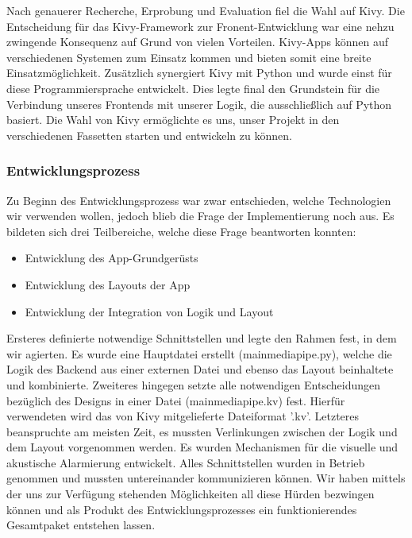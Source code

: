 		Nach genauerer Recherche, Erprobung und Evaluation fiel die Wahl auf Kivy. Die Entscheidung für das Kivy-Framework zur Fronent-Entwicklung war eine nehzu zwingende Konsequenz auf Grund von vielen Vorteilen. Kivy-Apps können auf verschiedenen Systemen zum Einsatz kommen und bieten somit eine breite Einsatzmöglichkeit. Zusätzlich synergiert Kivy mit Python und wurde einst für diese Programmiersprache entwickelt. Dies legte final den Grundstein für die Verbindung unseres Frontends mit unserer Logik, die ausschließlich auf Python basiert. Die Wahl von Kivy ermöglichte es uns, unser Projekt in den verschiedenen Fassetten starten und entwickeln zu können.
		
	\subsubsection{Entwicklungsprozess}
	\label{sssec:entwicklung}
		
		Zu Beginn des Entwicklungsprozess war zwar entschieden, welche Technologien wir verwenden wollen, jedoch blieb die Frage der Implementierung noch aus. Es bildeten sich drei Teilbereiche, welche diese Frage beantworten konnten:
		\begin{itemize}
			\item Entwicklung des App-Grundgerüsts
			\item Entwicklung des Layouts der App
			\item Entwicklung der Integration von Logik und Layout
		\end{itemize}
		
		\noindent Ersteres definierte notwendige Schnittstellen und legte den Rahmen fest, in dem wir agierten. Es wurde eine Hauptdatei erstellt (mainmediapipe.py), welche die Logik des Backend aus einer externen Datei und ebenso das Layout beinhaltete und kombinierte. Zweiteres hingegen setzte alle notwendigen Entscheidungen bezüglich des Designs in einer Datei (mainmediapipe.kv) fest. Hierfür verwendeten wird das von Kivy mitgelieferte Dateiformat '.kv'. Letzteres beanspruchte am meisten Zeit, es mussten Verlinkungen zwischen der Logik und dem Layout vorgenommen werden. Es wurden Mechanismen für die visuelle und akustische Alarmierung entwickelt. Alles Schnittstellen wurden in Betrieb genommen und mussten untereinander kommunizieren können. Wir haben mittels der uns zur Verfügung stehenden Möglichkeiten all diese Hürden bezwingen können und als Produkt des Entwicklungsprozesses ein funktionierendes Gesamtpaket entstehen lassen.

